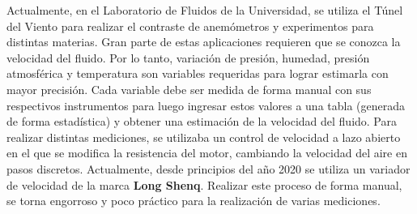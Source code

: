 Actualmente, en el Laboratorio de Fluidos de la Universidad, se utiliza el Túnel del Viento para realizar el contraste de anemómetros y experimentos para distintas materias. Gran parte de estas aplicaciones requieren que se conozca la velocidad del fluido. Por lo tanto, variación de presión, humedad, presión atmosférica y temperatura son variables requeridas para lograr estimarla con mayor precisión.
Cada variable debe ser medida de forma manual con sus respectivos instrumentos para luego ingresar estos valores a una tabla (generada de forma estadística) y obtener una estimación de la velocidad del fluido.
Para realizar distintas mediciones, se utilizaba un control de velocidad a lazo abierto en el que se modifica la resistencia del motor, cambiando la velocidad del aire en pasos discretos. Actualmente, desde principios del año 2020 se utiliza un variador de velocidad de la marca \textbf{Long Shenq}.
Realizar este proceso de forma manual, se torna engorroso y poco práctico para la realización de varias mediciones.

\newpage